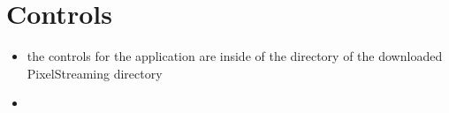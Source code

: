     \section{Controls}
        \begin{itemize}
            \item the controls for the application are inside of the  directory of the downloaded PixelStreaming directory
            \item 
        \end{itemize}